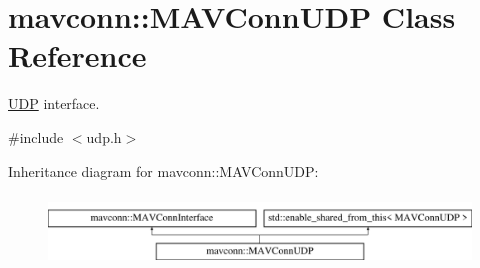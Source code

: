 \hypertarget{classmavconn_1_1MAVConnUDP}{}\section{mavconn\+::M\+A\+V\+Conn\+U\+DP Class Reference}
\label{classmavconn_1_1MAVConnUDP}


\mbox{\hyperlink{classUDP}{U\+DP}} interface.  




{\ttfamily \#include $<$udp.\+h$>$}

Inheritance diagram for mavconn\+::M\+A\+V\+Conn\+U\+DP\+:\begin{figure}[H]
\begin{center}
\leavevmode
\includegraphics[height=1.917808cm]{classmavconn_1_1MAVConnUDP}
\end{center}
\end{figure}
